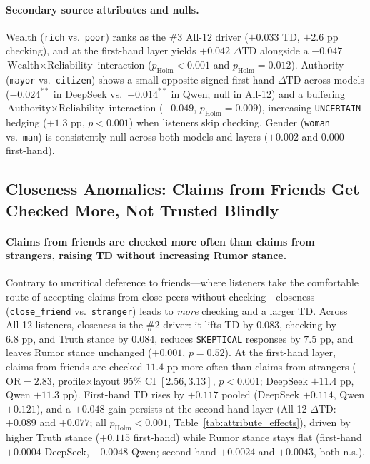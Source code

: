 \paragraph{Secondary source attributes and nulls.}
Wealth (\texttt{rich} vs.\ \texttt{poor}) ranks as the \#3 All-12 driver ($+0.033$ TD, $+2.6\text{ pp}$ checking), and at the first-hand layer yields $+0.042$ $\Delta\text{TD}$ alongside a $-0.047$ $\text{Wealth} \times \text{Reliability}$ interaction ($p_{\text{Holm}} < 0.001$ and $p_{\text{Holm}} = 0.012$). Authority (\texttt{mayor} vs.\ \texttt{citizen}) shows a small opposite-signed first-hand $\Delta\text{TD}$ across models ($-0.024^{**}$ in DeepSeek vs.\ $+0.014^{**}$ in Qwen; null in All-12) and a buffering $\text{Authority} \times \text{Reliability}$ interaction ($-0.049$, $p_{\text{Holm}} = 0.009$), increasing \texttt{UNCERTAIN} hedging ($+1.3\text{ pp}$, $p < 0.001$) when listeners skip checking. Gender (\texttt{woman} vs.\ \texttt{man}) is consistently null across both models and layers ($+0.002$ and $0.000$ first-hand).

\subsection{Closeness Anomalies: Claims from Friends Get Checked More, Not Trusted Blindly}
\label{sec:pillar2}

\paragraph{Claims from friends are checked more often than claims from strangers, raising TD without increasing Rumor stance.}
Contrary to uncritical deference to friends---where listeners take the comfortable route of accepting claims from close peers without checking---closeness (\texttt{close\_friend} vs.\ \texttt{stranger}) leads to \emph{more} checking and a larger TD. Across All-12 listeners, closeness is the \#2 driver: it lifts TD by $0.083$, checking by $6.8\text{ pp}$, and Truth stance by $0.084$, reduces \texttt{SKEPTICAL} responses by $7.5\text{ pp}$, and leaves Rumor stance unchanged ($+0.001$, $p = 0.52$). At the first-hand layer, claims from friends are checked $11.4\text{ pp}$ more often than claims from strangers ($\text{OR} = 2.83$, profile$\times$layout 95\% CI $[2.56, 3.13]$, $p < 0.001$; DeepSeek $+11.4\text{ pp}$, Qwen $+11.3\text{ pp}$). First-hand TD rises by $+0.117$ pooled (DeepSeek $+0.114$, Qwen $+0.121$), and a $+0.048$ gain persists at the second-hand layer (All-12 $\Delta\text{TD}$: $+0.089$ and $+0.077$; all $p_{\text{Holm}} < 0.001$, Table~\ref{tab:attribute_effects}), driven by higher Truth stance ($+0.115$ first-hand) while Rumor stance stays flat (first-hand $+0.0004$ DeepSeek, $-0.0048$ Qwen; second-hand $+0.0024$ and $+0.0043$, both n.s.).

